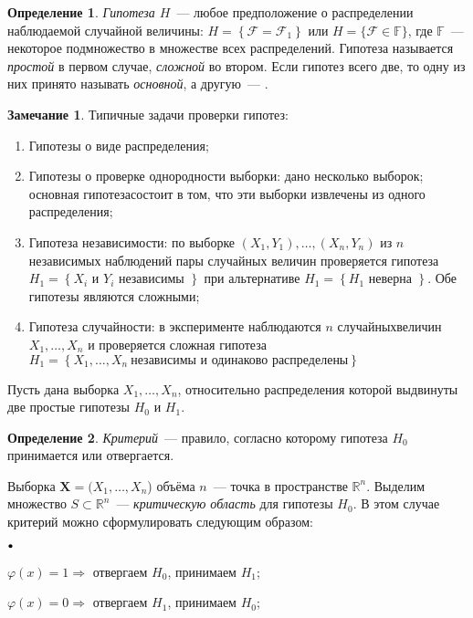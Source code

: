 \documentclass[oneside,final,14pt]{extreport}
\theoremstyle{plain}
\theoremstyle{definition}
\newtheorem*{defn}{Определение}
\newtheorem*{rmrk}{Замечание}
\theoremstyle{named}
\newcommand\sbullet[1][.5]{\mathbin{\vcenter{\hbox{\scalebox{#1}{$\bullet$}}}}}
\newenvironment{compactlist}{
\begin{list}{{$\sbullet[.75]$}}{
\setlength\partopsep{0pt}
\setlength\parskip{0pt}
\setlength\parsep{0pt}
\setlength\topsep{0pt}
\setlength\itemsep{0pt}
}
}{
\end{list}
}
\begin{document}
\begin{defn}
{\it Гипотеза $H$}~--- любое предположение о распределении наблюдаемой случайной величины: $H=\left\{\mathcal{F}=\mathcal{F}_{1}\right\}$ или $H=\{\mathcal{F} \in \mathbb{F}\}$, где $\mathbb{F}$~--- некоторое подмножество в множестве всех распределений. Гипотеза называется {\it простой} в первом случае, {\it сложной} во втором. Если гипотез всего две, то одну из них принято называть {\it основной}, а другую~--- {}.
\end{defn}

\begin{rmrk} Типичные задачи проверки гипотез:
\begin{enumerate}
    \item Гипотезы о виде распределения;
    \item Гипотезы о проверке однородности выборки: дано несколько выборок; основная гипотезасостоит в том, что эти выборки извлечены из одного распределения;
    \item Гипотеза независимости: по выборке $(X_1,Y_1), \ldots, (X_n,Y_n)$ из $n$ независимых наблюдений пары случайных величин проверяется гипотеза $H_{1}=\left\{X_{i} \text { и } Y_{i} \text { независимы }\right\}$ при альтернативе $H_{1}=\left\{H_{1} \text { неверна }\right\}$. Обе гипотезы являются сложными;
    \item Гипотеза случайности: в эксперименте наблюдаются $n$ случайныхвеличин $X_{1}, \ldots, X_{n}$ и проверяется сложная гипотеза $H_{1}=\left\{X_{1}, \ldots, X_{n}~ \text{независимы и одинаково распределены}\right\}$
\end{enumerate}
\end{rmrk}

Пусть дана выборка $X_{1}, \ldots, X_{n}$, относительно распределения которой выдвинуты две простые гипотезы $H_{0}$ и $H_1$.
\begin{defn}
{\it Критерий}~--- правило, согласно которому гипотеза $H_0$ принимается или отвергается.
\end{defn}
Выборка $\mathbf{X} = (X_1, \ldots, X_n$) объёма $n$~--- точка в пространстве $\mathbb{R}^{n}$. Выделим множество $S \subset \mathbb{R}^{n}$~--- {\it критическую область} для гипотезы $H_0$. В этом случае критерий можно сформулировать следующим образом:
\begin{compactlist}
    \item $\varphi(x) = 1 \Rightarrow$ отвергаем $H_0$, принимаем $H_1$;
    \item $\varphi(x) = 0 \Rightarrow$ отвергаем $H_1$, принимаем $H_0$;
\end{compactlist}
\end{document}
